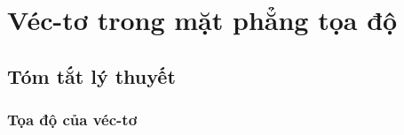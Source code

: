 \setcounter{section}{0}
\setcounter{ex}{0}
\setcounter{vd}{0}
\setcounter{bt}{0}
\section*{Véc-tơ trong mặt phẳng tọa độ}
\subsection{Tóm tắt lý thuyết}
\subsubsection{Tọa độ của véc-tơ}
